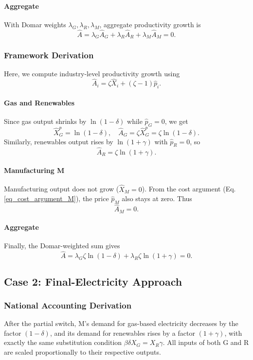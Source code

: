 \documentclass[11pt]{article}
\begin{document}
\paragraph{Aggregate}
With Domar weights $\lambda_G,\lambda_R,\lambda_M$, aggregate productivity growth is
\[
    \hat{A}
= \lambda_G\hat{A}_G
  + \lambda_R\hat{A}_R
  + \lambda_M\hat{A}_M
= 0.
\]

\subsubsection{Framework Derivation}

Here, we compute industry-level productivity growth using
\[
    \hat{A}_i
= \zeta \hat{X}_i  +  (\zeta-1) \hat{p}_i.
\]

\paragraph{Gas and Renewables}
Since gas output shrinks by $\ln(1-\delta)$ while $\hat{p}_G=0$, we get
\[
    \hat{X}_G^p = \ln(1-\delta),
    \quad
    \hat{A}_G = \zeta  \hat{X}_G^p = \zeta \ln(1-\delta).
\]
Similarly, renewables output rises by $\ln(1+\gamma)$ with $\hat{p}_R=0$, so
\[
    \hat{A}_R
= \zeta \ln(1+\gamma).
\]

\paragraph{Manufacturing M}
Manufacturing output does not grow ($\hat{X}_M=0$). From the cost argument (Eq. \ref{eq_cost_argument_M}), the price $\hat{p}_M$ also stays at zero. Thus
\[
    \hat{A}_M = 0.
\]

\paragraph{Aggregate}
Finally, the Domar-weighted sum gives
\[
    \hat{A}
= \lambda_G \zeta \ln(1-\delta)
   + 
  \lambda_R \zeta \ln(1+\gamma)
= 0.
\]

\subsection{Case 2: Final-Electricity Approach}
\label{subappendix_final_energy}
\subsubsection{National Accounting Derivation}

After the partial switch, M's demand for gas-based electricity decreases by the factor $(1-\delta)$, and its demand for renewables rises by a factor $(1+\gamma)$, with exactly the same substitution condition $\beta \delta X_G = X_R \gamma$. All inputs of both G and R are scaled proportionally to their respective outputs.
\end{document}
